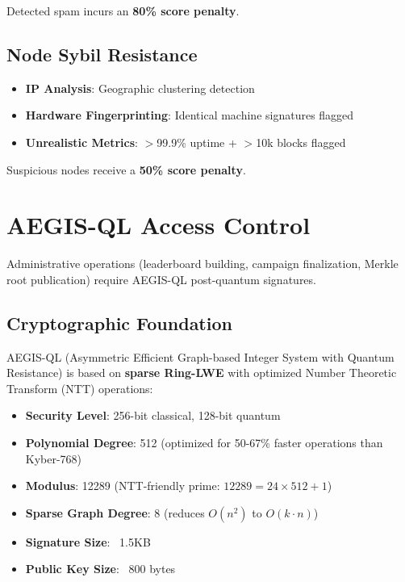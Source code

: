 \documentclass[11pt,a4paper]{article}
\begin{document}
Detected spam incurs an \textbf{80\% score penalty}.

\subsection{Node Sybil Resistance}

\begin{itemize}
    \item \textbf{IP Analysis}: Geographic clustering detection
    \item \textbf{Hardware Fingerprinting}: Identical machine signatures flagged
    \item \textbf{Unrealistic Metrics}: $>$99.9\% uptime + $>$10k blocks flagged
\end{itemize}

Suspicious nodes receive a \textbf{50\% score penalty}.

\section{AEGIS-QL Access Control}

Administrative operations (leaderboard building, campaign finalization, Merkle root publication) require AEGIS-QL post-quantum signatures.

\subsection{Cryptographic Foundation}

AEGIS-QL (Asymmetric Efficient Graph-based Integer System with Quantum Resistance) is based on \textbf{sparse Ring-LWE} with optimized Number Theoretic Transform (NTT) operations:

\begin{itemize}
    \item \textbf{Security Level}: 256-bit classical, 128-bit quantum
    \item \textbf{Polynomial Degree}: 512 (optimized for 50-67\% faster operations than Kyber-768)
    \item \textbf{Modulus}: 12289 (NTT-friendly prime: $12289 = 24 \times 512 + 1$)
    \item \textbf{Sparse Graph Degree}: 8 (reduces $O(n^2)$ to $O(k \cdot n)$)
    \item \textbf{Signature Size}: ~1.5KB
    \item \textbf{Public Key Size}: ~800 bytes
\end{itemize}
\end{document}
